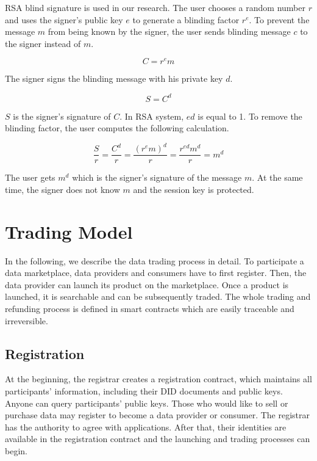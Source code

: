 \documentclass[conference]{IEEEtran}
\begin{document}
RSA blind signature\cite{cryptoNote} is used in our research. The user chooses a random number $r$ and uses the signer's public key $e$ to generate a blinding factor $r^e$. To prevent the message $m$ from being known by the signer, the user sends blinding message $c$ to the signer instead of $m$.

\begin{equation}
C = r^e m
\end{equation}

The signer signs the blinding message with his private key $d$.

\begin{equation}
S = C^d
\end{equation}

$S$ is the signer's signature of $C$. In RSA system, $ed$ is equal to 1. To remove the blinding factor, the user computes the following calculation.

\begin{equation}
\frac{S}{r}= \frac{C^d}{r} = \frac{(r^e m)^d}{r} = \frac{r^{ed} m^d}{r} = m^d
\end{equation}
 
The user gets $m^d$ which is the signer's signature of the message $m$. At the same time, the signer does not know $m$ and the session key is protected. 

\section{Trading Model}
In the following, we describe the data trading process in detail. To participate a data marketplace, data providers and consumers have to first register. Then,  the data provider can launch its product on the marketplace. Once a product is launched, it is searchable and can be subsequently traded. The whole trading and refunding process is defined in smart contracts which are easily traceable and irreversible.

\subsection{Registration}
At the beginning, the registrar creates a registration contract, which maintains all participants' information, including their DID documents and public keys. Anyone can query participants' public keys. Those who would like to sell or purchase data may register to become a data provider or consumer. The registrar has the authority to agree with applications. After that, their identities are available in the registration contract and the launching and trading processes can begin.
\end{document}
